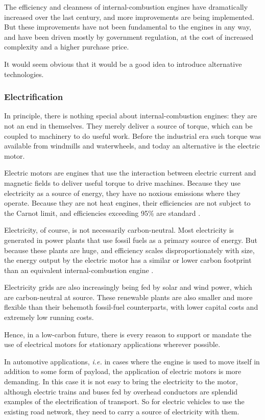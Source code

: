 The efficiency and cleanness of internal\hyp{}combustion engines have
dramatically increased over the last century, and more improvements are being
implemented. But these improvements have not been fundamental to the engines in
any way, and have been driven mostly by government regulation, at the cost of
increased complexity and a higher purchase price.

It would seem obvious that it would be a good idea to introduce alternative
technologies. 

\subsubsection{Electrification}

In principle, there is nothing special about internal\hyp{}combustion engines:
they are not an end in themselves. They mere\-ly deliver a source of torque,
which can be coupled to machinery to do useful work. Before the industrial era
such torque was available from windmills and waterwheels, and today an
alternative is the electric motor.

Electric motors are engines that use the interaction between electric current
and magnetic fields to deliver useful torque to drive machines. Because they use
electricity as a source of energy, they have no noxious emissions where they
operate. Because they are not heat engines, their efficiencies are not subject
to the Carnot limit, and efficiencies exceeding 95\% are standard \autocite{Li2012}.

Electricity, of course, is not necessarily carbon-neutral. Most electricity is
generated in power plants that use fossil fuels as a primary source of energy.
But because these plants are huge, and efficiency scales disproportionately with
size, the energy output by the electric motor has a similar or lower carbon
footprint than an equivalent internal\hyp{}combustion engine \autocite{Doucette2011}.

Electricity grids are also increasingly being fed by solar and wind power,
which are carbon-neutral at source. These renewable plants are also smaller and
more flexible than their behemoth fossil-fuel counterparts, with lower capital
costs and extremely low running costs.

Hence, in a low-carbon future, there is every reason to support or mandate the
use of electrical motors for stationary applications wherever possible.

In automotive applications, \textit{i.e.} in cases where the engine is used to
move itself in addition to some form of payload, the application of electric
motors is more demanding. In this case it is not easy to bring the electricity
to the motor, although electric trains and buses fed by overhead conductors are
splendid examples of the electrification of transport. So for electric vehicles
to use the existing road network, they need to carry a source of electricity
with them.

